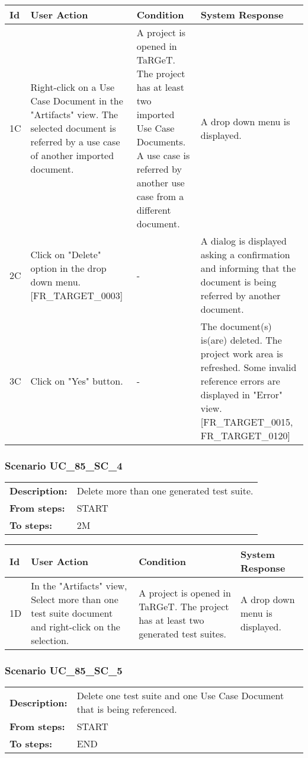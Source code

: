 \documentclass[a4paper,11pt]{article}
\newcommand{\bl}{\\ \hline}
\begin{document}
\begin{tabular}{|p{0.8in}|p{1.6in}|p{1.6in}|p{1.6in}|}
\hline
Id & User Action & Condition & System Response  \bl 
1C & Right-click on a Use Case Document in the "Artifacts" view. The selected document is referred by a use case of another imported document. & A project is opened in TaRGeT. The project has at least two imported Use Case Documents. A use case is referred by another use case from a different document. & A drop down menu is displayed. \bl 
2C & Click on "Delete" option in the drop down menu. [FR_TARGET_0003] & - & A dialog is displayed asking a confirmation and informing that the document is being referred by another document. \bl 
3C & Click on "Yes" button. & - & The document(s) is(are) deleted. The project work area is refreshed. Some invalid reference errors are displayed in "Error" view. [FR_TARGET_0015, FR_TARGET_0120] \bl 
\end{tabular}
\subsubsection*{Scenario UC_85_SC_4}
\begin{tabular}{p{1in}p{4in}}
{\bf Description:} & Delete more than one generated test suite. \\
{\bf From steps:} & START \\
{\bf To steps:} & 2M \\
\end{tabular}
 
\begin{tabular}{|p{0.8in}|p{1.6in}|p{1.6in}|p{1.6in}|}
\hline
Id & User Action & Condition & System Response  \bl 
1D & In the "Artifacts" view, Select more than one test suite document and right-click on the selection. & A project is opened in TaRGeT. The project has at least two generated test suites. & A drop down menu is displayed. \bl 
\end{tabular}
\subsubsection*{Scenario UC_85_SC_5}
\begin{tabular}{p{1in}p{4in}}
{\bf Description:} & Delete one test suite and one Use Case Document that is being referenced. \\
{\bf From steps:} & START \\
{\bf To steps:} & END \\
\end{tabular}
 
\end{document}
